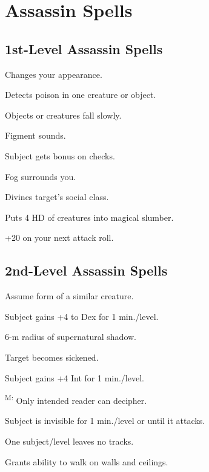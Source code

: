 \section{Assassin Spells}




\subsection{1st-Level Assassin Spells}

 Changes your appearance.

 Detects poison in one creature or object.

 Objects or creatures fall slowly.

 Figment sounds.

 Subject gets bonus on  checks.

 Fog surrounds you.

 Divines target's social class. %

 Puts 4 HD of creatures into magical slumber.

 +20 on your next attack roll.




\subsection{2nd-Level Assassin Spells}

 Assume form of a similar creature.

 Subject gains +4 to Dex for 1 min./level.

 6-m radius of supernatural shadow.

 Target becomes sickened. %

 Subject gains +4 Int for 1 min./level.

\textsuperscript{M:} Only intended reader can decipher.

 Subject is invisible for 1 min./level or until it attacks.

 One subject/level leaves no tracks.

 Grants ability to walk on walls and ceilings.

